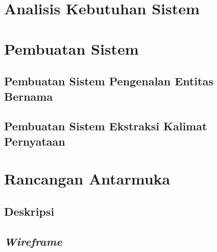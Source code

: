 \documentclass[ugmskripsi]{ugmskripsi}
\begin{document}
	\section{Analisis Kebutuhan Sistem}
	\label{rancangan analisis kebutuhan sistem}
	

	\section{Pembuatan Sistem}
	\label{rancangan pembuatan sistem}

		\subsection{Pembuatan Sistem Pengenalan Entitas Bernama}
		\label{rancangan pembuatan sistem pengenalan entitas bernama}
		

		\subsection{Pembuatan Sistem Ekstraksi Kalimat Pernyataan}
		\label{rancangan sistem ekstraksi kalimat pernyataan}
		

	\section{Rancangan Antarmuka}
	\label{rancangan antarmuka}

		\subsection{Deskripsi}
		\label{rancangan deskripsi antarmuka}
		

		\subsection{\textit{Wireframe}}
	    \label{rancangan wireframe antarmuka}
	    



\end{document}
